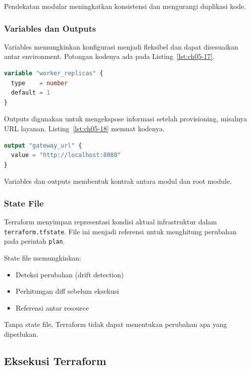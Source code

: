 Pendekatan modular meningkatkan konsistensi dan mengurangi duplikasi kode.

\subsubsection*{Variables dan Outputs}

Variables memungkinkan konfigurasi menjadi fleksibel dan dapat disesuaikan antar environment. Potongan kodenya ada pada Listing~\ref{lst:ch05-17}.

\begin{lstlisting}[language=terraform, caption={Potongan kode Terraform pada Variables dan Outputs}, label={lst:ch05-17}]
variable "worker_replicas" {
  type    = number
  default = 1
}
\end{lstlisting}

Outputs digunakan untuk mengekspose informasi setelah provisioning, misalnya URL layanan. Listing~\ref{lst:ch05-18} memuat kodenya.

\begin{lstlisting}[language=terraform, caption={Potongan kode Terraform pada Variables dan Outputs (2)}, label={lst:ch05-18}]
output "gateway_url" {
  value = "http://localhost:8088"
}
\end{lstlisting}

Variables dan outputs membentuk kontrak antara modul dan root module.

\subsubsection*{State File}

Terraform menyimpan representasi kondisi aktual infrastruktur dalam \texttt{terraform.tfstate}. File ini menjadi referensi untuk menghitung perubahan pada perintah \texttt{plan}.

State file memungkinkan:

\begin{itemize}
\item Deteksi perubahan (drift detection)
\item Perhitungan diff sebelum eksekusi
\item Referensi antar resource
\end{itemize}

Tanpa state file, Terraform tidak dapat menentukan perubahan apa yang diperlukan.

\subsection{Eksekusi Terraform}

